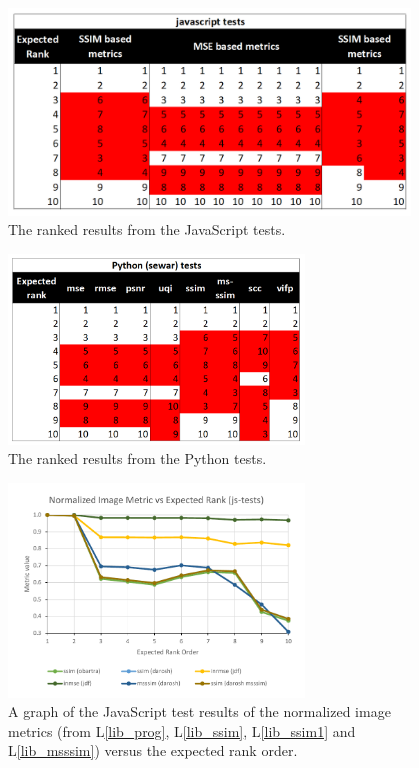 \documentclass[12pt, titlepage]{article}
\newcommand{\lref}[1]{L\ref{#1}}
\begin{document}
\begin{figure}[h!]
  \begin{center}
  \includegraphics[width=0.95\textwidth]{test-analysis/js-ranked.png}
  \caption{The ranked results from the JavaScript tests.}
  \label{fig_js_ranks}
  \end{center}
\end{figure}

\begin{figure}[h!]
  \begin{center}
  \includegraphics[width=0.7\textwidth]{test-analysis/py-ranked.png}
  \caption{The ranked results from the Python tests.}
  \label{fig_py_ranks}
  \end{center}
\end{figure}


\begin{figure}[h!]
  \begin{center}
  \includegraphics[width=0.7\textwidth]{test-analysis/js-graph.pdf}
  \caption{A graph of the JavaScript test results of the normalized
  image metrics (from \lref{lib_prog}, \lref{lib_ssim},
  \lref{lib_ssim1} and \lref{lib_msssim}) versus the expected rank order.}
  \label{fig_js_graph}
  \end{center}
\end{figure}
\end{document}
